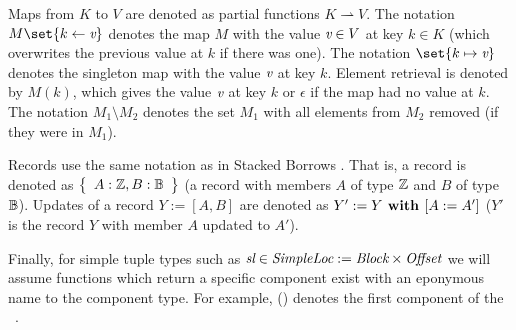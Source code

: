 Maps from $K$ to $V$ are denoted as partial functions $K \rightharpoonup V$.
The notation $M\set{k \leftarrow \Valvar}$ denotes the map $M$ with the value $\textit{v} \in V$ at key $k \in K$
(which overwrites the previous value at $k$ if there was one).
The notation $\set{k \mapsto \Valvar}$ denotes the singleton map with the value $\textit{v}$ at key $k$.
Element retrieval is denoted by $M(k)$, which gives the value $\textit{v}$ at key $k$ or $\epsilon$ if the map had no value at $k$. 
The notation $M_1 \setminus M_2$ denotes the set $M_1$ with all elements from $M_2$ removed (if they were in $M_1$).

Records use the same notation as in Stacked Borrows \cite{jung2019stacked}.
That is, a record is denoted as $\left\{\begin{array}{l} A : \mathbb{Z}, B : \mathbb{B} \end{array} \right\}$ (\eg a record
with members $A$ of type $\mathbb{Z}$ and $B$ of type $\mathbb{B}$).
Updates of a record $Y := [A, B]$ are denoted as $Y' := Y \textbf{ with } [A := A']$ (\ie $Y'$ is the record $Y$ with
member $A$ updated to $A'$).

Finally, for simple tuple types such as $\textit{sl} \in \textit{SimpleLoc} := \textit{Block} \times \textit{Offset}$ we will
assume functions which return a specific component exist with an eponymous name to the component type.
For example, (\Simplelocvar) denotes the first component of the \Simpleloc \ \Simplelocvar.




